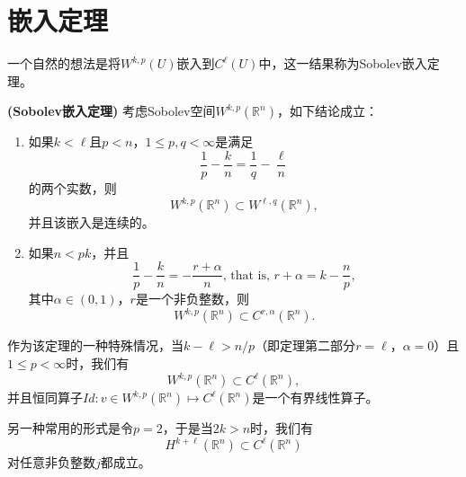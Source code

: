 \documentclass[a4paper,10pt]{ctexart}
\begin{document}
\section{嵌入定理}
一个自然的想法是将$ W^{k,p}(U) $嵌入到$ C^\ell(U) $中，这一结果称为Sobolev嵌入定理。
\begin{theorem}{\normalfont\textbf{(Sobolev嵌入定理)}}
    考虑Sobolev空间$ W^{k,p}(\mathbb{R}^n) $，如下结论成立：
    \begin{enumerate}
        \item 如果$ k<\ell $且$ p<n $，$ 1\leqslant p,q<\infty $是满足
        \begin{equation}
            \frac{1}{p} - \frac{k}{n} = \frac{1}{q} - \frac{\ell}{n}
        \end{equation}
        的两个实数，则
        \begin{equation}
            W^{k,p}(\mathbb{R}^n) \subset W^{\ell,q}(\mathbb{R}^n),
        \end{equation}
        并且该嵌入是连续的。
        \item 如果$ n<pk $，并且
        \begin{equation}
            \frac{1}{p} - \frac{k}{n} = - \frac{r+\alpha}{n} \text{, that is, } r+\alpha = k - \frac{n}{p},
        \end{equation}
        其中$ \alpha\in(0,1) $，$ r $是一个非负整数，则
        \begin{equation}
            W^{k,p}(\mathbb{R}^n) \subset C^{r,\alpha}(\mathbb{R}^n).
        \end{equation}
    \end{enumerate}
\end{theorem}
作为该定理的一种特殊情况，当$ k-\ell > n / p $（即定理第二部分$ r=\ell $，$ \alpha=0 $）且$ 1\leqslant p<\infty $时，我们有
\begin{equation}
    W^{k,p}(\mathbb{R}^n) \subset C^\ell(\mathbb{R}^n),
\end{equation}
并且恒同算子$ Id: v\in W^{k,p}(\mathbb{R}^n)\mapsto C^\ell(\mathbb{R}^n) $是一个有界线性算子。

另一种常用的形式是令$ p=2 $，于是当$ 2k>n $时，我们有
\begin{equation}
    H^{k+\ell}(\mathbb{R}^n) \subset C^\ell(\mathbb{R}^n)
\end{equation}
对任意非负整数$ j $都成立。
\end{document}
